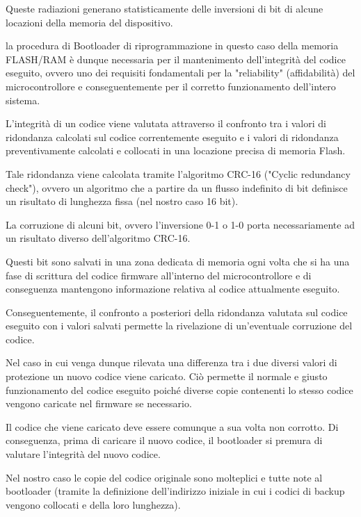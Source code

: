 \documentclass[LaM,binding=0.6cm]{../sapthesis}
\begin{document}
Queste radiazioni generano statisticamente delle inversioni di bit di alcune locazioni della memoria del dispositivo.

la procedura di Bootloader di riprogrammazione in questo caso della memoria FLASH/RAM è dunque necessaria per il mantenimento dell'integrità del codice eseguito, ovvero uno dei requisiti fondamentali per la "reliability" (affidabilità) del microcontrollore e conseguentemente per il corretto funzionamento dell'intero sistema.\newline

L'integrità di un codice viene valutata attraverso il confronto tra i valori di ridondanza calcolati sul codice correntemente eseguito e i valori di ridondanza preventivamente calcolati e collocati in una locazione precisa di memoria Flash.


Tale ridondanza viene calcolata tramite l'algoritmo CRC-16 ("Cyclic redundancy check"), ovvero un algoritmo che a partire da un flusso indefinito di bit definisce un risultato di lunghezza fissa (nel nostro caso 16 bit).\newline

La corruzione di alcuni bit, ovvero l'inversione 0-1 o 1-0 porta necessariamente ad un risultato diverso dell'algoritmo CRC-16.

Questi bit sono salvati in una zona dedicata di memoria ogni volta che si ha una fase di scrittura del codice firmware all’interno del microcontrollore e di conseguenza mantengono informazione relativa al codice attualmente eseguito.\newline

Conseguentemente, il confronto a posteriori della ridondanza valutata sul codice eseguito con i valori salvati permette la rivelazione di un’eventuale corruzione del codice.

Nel caso in cui venga dunque rilevata una differenza tra i due diversi valori di protezione un nuovo codice viene caricato. Ciò permette il normale e giusto funzionamento del codice eseguito poiché diverse copie contenenti lo stesso codice vengono caricate nel firmware se necessario.

Il codice che viene caricato deve essere comunque a sua volta non corrotto. Di conseguenza, prima di caricare il nuovo codice, il bootloader si premura di valutare l'integrità del nuovo codice.

Nel nostro caso le copie del codice originale sono molteplici e tutte note al bootloader (tramite la definizione dell'indirizzo iniziale in cui i codici di backup vengono collocati e della loro lunghezza).
\end{document}
